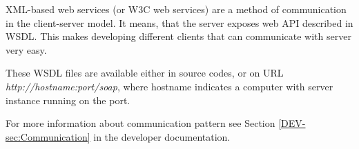 XML-based web services (or W3C web services) are a method of communication in
the client-server model. It means, that the server exposes web API described in
WSDL. This makes developing different clients that can communicate with
\textan{} server very easy.

These WSDL files are available either in source codes, or on URL \emph{http://hostname:port/soap},
where hostname indicates a computer with \textan{} server instance running on the port.

For more information about communication pattern see Section
\ref{DEV-sec:Communication} in the developer documentation.
